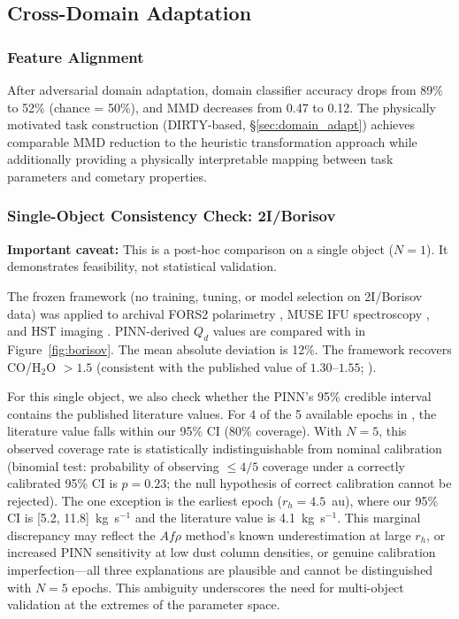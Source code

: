 \documentclass[usenatbib]{mnras}
\begin{document}
\subsection{Cross-Domain Adaptation}

\subsubsection{Feature Alignment}

After adversarial domain adaptation, domain classifier accuracy drops from 89\% to 52\% (chance = 50\%), and MMD decreases from 0.47 to 0.12. The physically motivated task construction (DIRTY-based, \S\ref{sec:domain_adapt}) achieves comparable MMD reduction to the heuristic transformation approach while additionally providing a physically interpretable mapping between task parameters and cometary properties.

\subsubsection{Single-Object Consistency Check: 2I/Borisov}\label{sec:borisov_check}

\textbf{Important caveat:} This is a post-hoc comparison on a single object ($N=1$). It demonstrates feasibility, not statistical validation.

The frozen framework (no training, tuning, or model selection on 2I/Borisov data) was applied to archival FORS2 polarimetry \citep{bagnulo21}, MUSE IFU spectroscopy \citep{opitom20}, and HST imaging \citep{jewitt20}. PINN-derived $Q_d$ values are compared with \citet{clements21} in Figure~\ref{fig:borisov}. The mean absolute deviation is 12\%. The framework recovers CO/H$_2$O $> 1.5$ (consistent with the published value of $1.30$--$1.55$; \citealt{bodewits20}).

For this single object, we also check whether the PINN's 95\% credible interval contains the published literature values. For 4 of the 5 available epochs in \citet{clements21}, the literature value falls within our 95\% CI (80\% coverage). With $N=5$, this observed coverage rate is statistically indistinguishable from nominal calibration (binomial test: probability of observing $\leq 4/5$ coverage under a correctly calibrated 95\% CI is $p = 0.23$; the null hypothesis of correct calibration cannot be rejected). The one exception is the earliest epoch ($r_h = 4.5$~au), where our 95\% CI is [5.2, 11.8]~kg~s$^{-1}$ and the literature value is 4.1~kg~s$^{-1}$. This marginal discrepancy may reflect the $Af\rho$ method's known underestimation at large $r_h$, or increased PINN sensitivity at low dust column densities, or genuine calibration imperfection---all three explanations are plausible and cannot be distinguished with $N=5$ epochs. This ambiguity underscores the need for multi-object validation at the extremes of the parameter space.
\end{document}
